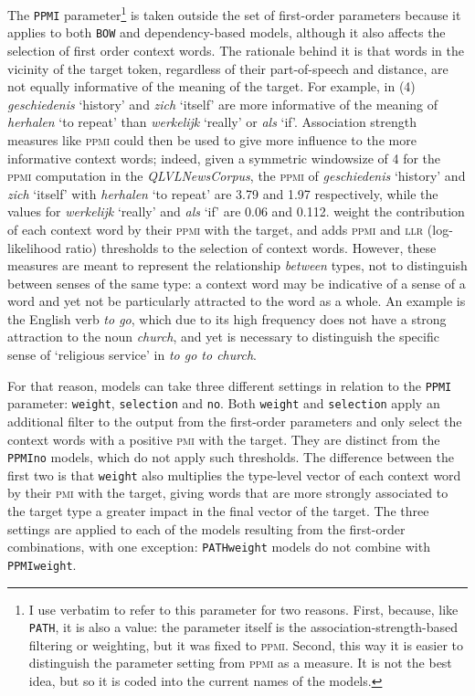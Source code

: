 \documentclass[
]{book}
\begin{document}
The \texttt{PPMI} parameter\footnote{I use verbatim to refer to this parameter for two reasons. First, because, like \texttt{PATH}, it is also a value: the parameter itself is the association-strength-based filtering or weighting, but it was fixed to \textsc{ppmi}. Second, this way it is easier to distinguish the parameter setting from \textsc{ppmi} as a measure. It is not the best idea, but so it is coded into the current names of the models.} is taken outside the set of first-order parameters because it applies to both \texttt{BOW} and dependency-based models, although it also affects the selection of first order context words. The rationale behind it is that words in the vicinity of the target token, regardless of their part-of-speech and distance, are not equally informative of the meaning of the target. For example, in (4) \emph{geschiedenis} `history' and \emph{zich} `itself' are more informative of the meaning of \emph{herhalen} `to repeat' than \emph{werkelijk} `really' or \emph{als} `if'. Association strength measures like \textsc{ppmi} could then be used to give more influence to the more informative context words; indeed, given a symmetric windowsize of 4 for the \textsc{ppmi} computation in the \emph{QLVLNewsCorpus}, the \textsc{ppmi} of \emph{geschiedenis} `history' and \emph{zich} `itself' with \emph{herhalen} `to repeat' are 3.79 and 1.97 respectively, while the values for \emph{werkelijk} `really' and \emph{als} `if' are 0.06 and 0.112.
\textcite{heylen.etal_2015} weight the contribution of each context word by their \textsc{ppmi} with the target, and \textcite{depascale_2019} adds \textsc{ppmi} and \textsc{llr} (log-likelihood ratio) thresholds to the selection of context words. However, these measures are meant to represent the relationship \emph{between} types, not to distinguish between senses of the same type: a context word may be indicative of a sense of a word and yet not be particularly attracted to the word as a whole. An example is the English verb \emph{to go}, which due to its high frequency does not have a strong attraction to the noun \emph{church}, and yet is necessary to distinguish the specific sense of `religious service' in \emph{to go to church}.

For that reason, models can take three different settings in relation to the \texttt{PPMI} parameter: \texttt{weight}, \texttt{selection} and \texttt{no}. Both \texttt{weight} and \texttt{selection} apply an additional filter to the output from the first-order parameters and only select the context words with a positive \textsc{pmi} with the target. They are distinct from the \texttt{PPMIno} models, which do not apply such thresholds. The difference between the first two is that \texttt{weight} also multiplies the type-level vector of each context word by their \textsc{pmi} with the target, giving words that are more strongly associated to the target type a greater impact in the final vector of the target. The three settings are applied to each of the models resulting from the first-order combinations, with one exception: \texttt{PATHweight} models do not combine with \texttt{PPMIweight}.
\end{document}
